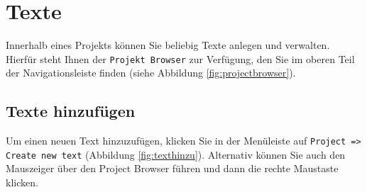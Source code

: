 \chapter{Texte}
Innerhalb eines Projekts können Sie beliebig Texte anlegen und verwalten. Hierfür steht Ihnen der \texttt{Projekt Browser} %
zur Verfügung, den Sie im oberen Teil der Navigationsleiste finden (siehe Abbildung \ref{fig:projectbrowser}).

\section{Texte hinzufügen}
\label{sec:newtext}
% 
Um einen neuen Text hinzuzufügen, klicken Sie in der Menüleiste auf \texttt{Project => Create new text} (Abbildung \ref{fig:texthinzu}). %
Alternativ können Sie auch den Mauszeiger über den Project Browser führen und dann die rechte Maustaste klicken.  %

